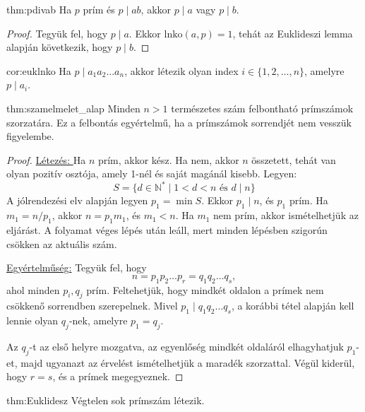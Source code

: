 \begin{theorem}{thm:pdivab}
Ha $p$ prím és $p\mid ab$, akkor $p\mid a$ vagy $p\mid b$.
\end{theorem}

\begin{proof}
Tegyük fel, hogy $p\mid a$. Ekkor $\mathrm{lnko}(a,p)=1$, tehát
az Euklideszi lemma alapján következik, hogy $p\mid b$.
\end{proof}
\begin{corollary}{cor:euklnko}
Ha $p\mid a_{1}a_{2}\dots a_{n}$, akkor létezik olyan index $i\in\{1,2,\dots,n\}$,
amelyre $p\mid a_{i}$.
\end{corollary}

\begin{theorem}{thm:szamelmelet_alap}
Minden $n>1$ természetes szám felbontható prímszámok szorzatára.
Ez a felbontás egyértelmű, ha a prímszámok sorrendjét nem vesszük
figyelembe.
\end{theorem}
\begin{proof}
\underline{Létezés: }Ha $n$ prím, akkor kész. Ha nem, akkor $n$ összetett,
tehát van olyan pozitív osztója, amely 1-nél és saját magánál kisebb.
Legyen: 
\[
S=\{d\in\mathbb{N}^{*}\mid1<d<n\text{ és }d\mid n\}
\]
A jólrendezési elv alapján legyen $p_{1}=\min S$. Ekkor $p_{1}\mid n$,
és $p_{1}$ prím. Ha $m_{1}=n/p_{1}$, akkor $n=p_{1}m_{1}$, és $m_{1}<n$.
Ha $m_{1}$ nem prím, akkor ismételhetjük az eljárást. A folyamat
véges lépés után leáll, mert minden lépésben szigorún csökken az aktuális
szám.

\underline{Egyértelműség:} Tegyük fel, hogy 
\[
n=p_{1}p_{2}\dots p_{r}=q_{1}q_{2}\dots q_{s},
\]
ahol minden $p_{i},q_{j}$ prím. Feltehetjük, hogy mindkét oldalon
a prímek nem csökkenő sorrendben szerepelnek. Mivel $p_{1}\mid q_{1}q_{2}\dots q_{s}$,
a korábbi tétel alapján kell lennie olyan $q_{j}$-nek, amelyre $p_{1}=q_{j}$.

Az $q_{j}$-t az első helyre mozgatva, az egyenlőség mindkét oldaláról
elhagyhatjuk $p_{1}$-et, majd ugyanazt az érvelést ismételhetjük
a maradék szorzattal. Végül kiderül, hogy $r=s$, és a prímek megegyeznek.
\end{proof}
\begin{theorem}[Eukleidész]{thm:Euklidesz}
Végtelen sok prímszám létezik.
\end{theorem}

